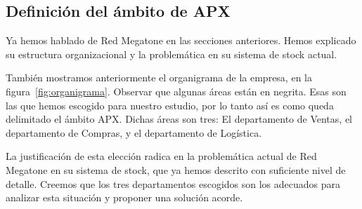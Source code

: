 \subsection{Definición del ámbito de APX}

Ya hemos hablado de Red Megatone en las secciones anteriores. Hemos explicado
su estructura organizacional y la problemática en su sistema de stock actual.

También mostramos anteriormente el organigrama de la empresa, en la
figura~\ref{fig:organigrama}. Observar que algunas áreas están en negrita. Esas
son las que hemos escogido para nuestro estudio, por lo tanto así es como queda
delimitado el ámbito APX. Dichas áreas son tres: El departamento de Ventas, el
departamento de Compras, y el departamento de Logística.

La justificación de esta elección radica en la problemática actual de Red
Megatone en su sistema de stock, que ya hemos descrito con suficiente nivel de
detalle. Creemos que los tres departamentos escogidos son los adecuados para
analizar esta situación y proponer una solución acorde.

